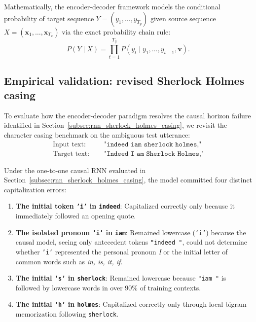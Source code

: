 \documentclass[../../../main.tex]{subfiles}
\begin{document}
Mathematically, the encoder-decoder framework models the conditional probability of target sequence $Y = (y_1, \dots, y_{T_y})$ given source sequence $X = (\mathbf{x}_1, \dots, \mathbf{x}_{T_x})$ via the exact probability chain rule:
\begin{equation}
P(Y \mid X) = \prod_{t=1}^{T_y} P\left(y_t \mid y_1, \dots, y_{t-1}, \mathbf{v}\right).
\label{eq:seq2seq_probability_factorization}
\end{equation}

\subsection{Empirical validation: revised Sherlock Holmes casing}
\label{subsec:rnn_seq2seq_casing_validation}

To evaluate how the encoder-decoder paradigm resolves the causal horizon failure identified in Section~\ref{subsec:rnn_sherlock_holmes_casing}, we revisit the character casing benchmark on the ambiguous test utterance:
\begin{align}
\text{Input text: } & \quad \texttt{"indeed iam sherlock holmes,"} \\
\text{Target text: } & \quad \texttt{"Indeed I am Sherlock Holmes,"}
\end{align}

Under the one-to-one causal RNN evaluated in Section~\ref{subsec:rnn_sherlock_holmes_casing}, the model committed four distinct capitalization errors:
\begin{enumerate}
    \item \textbf{The initial token \texttt{'i'} in \texttt{indeed}}: Capitalized correctly only because it immediately followed an opening quote.
    \item \textbf{The isolated pronoun \texttt{'i'} in \texttt{iam}}: Remained lowercase (\texttt{'i'}) because the causal model, seeing only antecedent tokens \texttt{"indeed "}, could not determine whether \texttt{'i'} represented the personal pronoun \textit{I} or the initial letter of common words such as \textit{in, is, it, if}.
    \item \textbf{The initial \texttt{'s'} in \texttt{sherlock}}: Remained lowercase because \texttt{"iam "} is followed by lowercase words in over $90\%$ of training contexts.
    \item \textbf{The initial \texttt{'h'} in \texttt{holmes}}: Capitalized correctly only through local bigram memorization following \texttt{sherlock}.
\end{enumerate}
\end{document}
